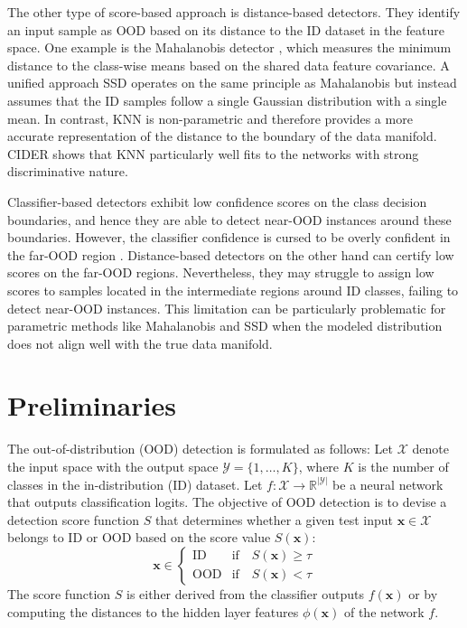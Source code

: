 \documentclass[10pt,twocolumn,letterpaper]{article}
\begin{document}
The other type of score-based approach is distance-based detectors. They identify an input sample as OOD based on its distance to the ID dataset in the feature space. One example is the Mahalanobis detector \cite{lee2018simple}, which measures the minimum distance to the class-wise means based on the shared data feature covariance.
A unified approach SSD \cite{sehwag2021ssd} operates on the same principle as Mahalanobis but instead assumes that the ID samples follow a single Gaussian distribution with a single mean. 
In contrast, KNN \cite{sun2022out} is non-parametric and therefore provides a more accurate representation of the distance to the boundary of the data manifold. CIDER \cite{ming2022exploit} shows that KNN particularly well fits to the networks with strong discriminative nature.


Classifier-based detectors exhibit low confidence scores on the class decision boundaries, and hence they are able to detect near-OOD instances around these boundaries.
However, the classifier confidence is cursed to be overly confident in the far-OOD region \cite{hein2019relu}.
Distance-based detectors on the other hand can certify low scores on the far-OOD regions.
Nevertheless, they may struggle to assign low scores to samples located in the intermediate regions around ID classes, failing to detect near-OOD instances. This limitation can be particularly problematic for parametric methods like Mahalanobis and SSD when the modeled distribution does not align well with the true data manifold.



\section{Preliminaries}
The out-of-distribution (OOD) detection is formulated as follows: Let $\mathcal{X}$ denote the input space with the output space $\mathcal{Y} = \{1, \dots, K\}$, where $K$ is the number of classes in the in-distribution (ID) dataset. Let $f: \mathcal{X} \to \mathbb{R}^{\lvert\mathcal{Y}\rvert}$ be a neural network that outputs classification logits. 
The objective of OOD detection is to devise a detection score function $S$ that determines whether a given test input $\mathbf{x} \in \mathcal{X}$ belongs to ID or OOD based on the score value $S(\mathbf{x})$:
\begin{equation}
\mathbf{x} \in 
\begin{cases}
\text{ID} &  \text{if} \quad S(\mathbf{x}) \geq \tau \\
\text{OOD} & \text{if} \quad S(\mathbf{x}) < \tau
\end{cases}
\end{equation}
The score function $S$ is either derived from the classifier outputs $f(\mathbf{x})$ or by computing the distances to the hidden layer features $\phi(\mathbf{x})$ of the network $f$.
\end{document}
